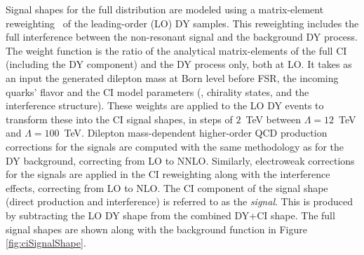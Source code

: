 Signal shapes for the full \mll distribution are modeled using a matrix-element reweighting~\cite{EXOT-2016-05} of the leading-order (LO) DY samples.
This reweighting includes the full interference between the non-resonant signal and the background DY process.
The weight function is the ratio of the analytical matrix-elements of the full CI (including the DY component) and the DY process only, both at LO.
It takes as an input the generated dilepton mass at Born level before FSR, the incoming quarks' flavor and the CI model parameters (\lam, chirality states, and the interference structure).
These weights are applied to the LO DY events to transform these into the CI signal shapes, in steps of $2$~TeV between $\Lambda=12$~TeV and $\Lambda=100$~TeV.
Dilepton mass-dependent higher-order QCD production corrections for the signals are computed with the same methodology as for the DY background, correcting from LO to NNLO.
Similarly, electroweak corrections for the signals are applied in the CI reweighting along with the interference effects, correcting from LO to NLO.
The CI component of the signal shape (direct production and interference) is referred to as the \emph{signal}. This is produced by subtracting the LO DY shape from the combined DY+CI shape.
The full \mll signal shapes are shown along with the background function in Figure \ref{fig:ciSignalShape}.

